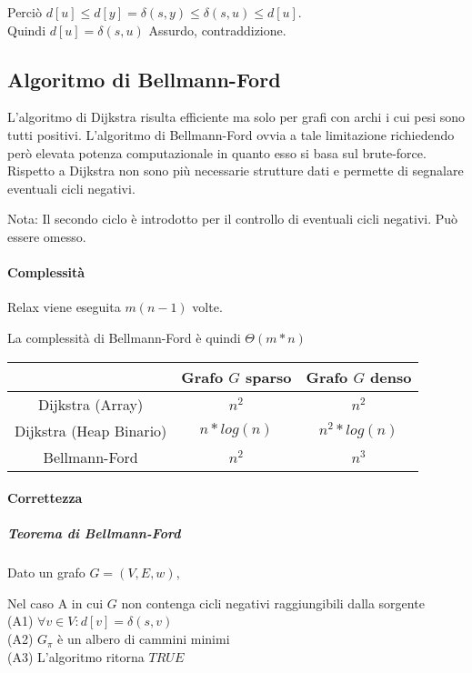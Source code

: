 Perciò $d[u] \leq d[y] = \delta(s,y) \leq \delta(s,u) \leq d[u]$. \\ Quindi $d[u]= \delta(s,u)$ Assurdo, contraddizione.


\subsection{Algoritmo di Bellmann-Ford}

{L'algoritmo di Dijkstra risulta efficiente ma solo per grafi con archi i cui pesi sono tutti positivi. L'algoritmo di Bellmann-Ford ovvia a tale limitazione richiedendo però elevata potenza computazionale in quanto esso si basa sul brute-force. Rispetto a Dijkstra non sono più necessarie strutture dati e permette di segnalare eventuali cicli negativi.}



Nota: Il secondo ciclo è introdotto per il controllo di eventuali cicli negativi. Può essere omesso.

\paragraph{Complessità}

Relax viene eseguita $m(n-1)$ volte.

La complessità di Bellmann-Ford è quindi $\Theta(m*n)$

\begin{tabular}{|c|c|c|}
\hline
  & Grafo $G$ sparso & Grafo $G$ denso \\
\hline
Dijkstra (Array) & $n^2$ & $n^2$ \\
\hline
Dijkstra (Heap Binario) & $n*log(n)$ & $n^2*log(n)$ \\
\hline
Bellmann-Ford & $n^2$ & $n^3$ \\
\hline
\end{tabular}

\paragraph{Correttezza}

\subparagraph{Teorema di Bellmann-Ford}

Dato un grafo $G=(V,E,w)$,

Nel caso A in cui $G$ non contenga cicli negativi raggiungibili dalla sorgente\\
(A1) $\forall v \in V : d[v] = \delta(s,v)$ \\
(A2) $G_\pi$ è un albero di cammini minimi\\
(A3) L'algoritmo ritorna $TRUE$

